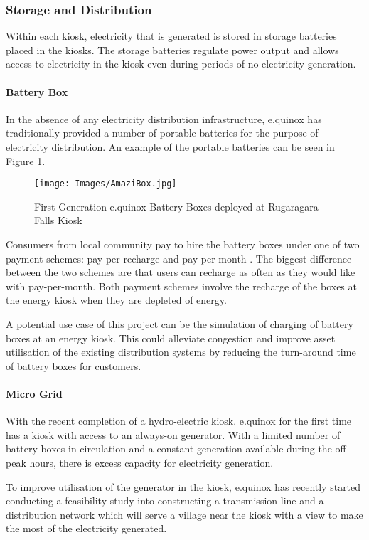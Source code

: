 \documentclass{article}
\begin{document}
\subsubsection{Storage and Distribution}
Within each kiosk, electricity that is generated is stored in storage batteries placed in the kiosks. The storage batteries regulate power output and allows access to electricity in the kiosk even during periods of no electricity generation.

\paragraph{Battery Box}
In the absence of any electricity distribution infrastructure, e.quinox has traditionally provided a number of portable batteries for the purpose of electricity distribution. An example of the portable batteries can be seen in Figure \ref{fig:AmaziBox}.

\begin{figure}[h!]
\centering
\texttt{[image: Images/AmaziBox.jpg]}
\caption{First Generation e.quinox Battery Boxes deployed at Rugaragara Falls Kiosk}
\label{fig:AmaziBox}
\end{figure}

Consumers from local community pay to hire the battery boxes under one of two payment schemes: pay-per-recharge and pay-per-month \cite{e.quinox-Hydro-web:2012}. The biggest difference between the two schemes are that users can recharge as often as they would like with pay-per-month. Both payment schemes involve the recharge of the boxes at the energy kiosk when they are depleted of energy.

A potential use case of this project can be the simulation of charging of battery boxes at an energy kiosk. This could alleviate congestion and improve asset utilisation of the existing distribution systems by reducing the turn-around time of battery boxes for customers.

\paragraph{Micro Grid}
With the recent completion of a hydro-electric kiosk. e.quinox for the first time has a kiosk with access to an always-on generator. With a limited number of battery boxes in circulation and a constant generation available during the off-peak hours, there is excess capacity for electricity generation.

To improve utilisation of the generator in the kiosk, e.quinox has recently started conducting a feasibility study into constructing a transmission line and a distribution network which will serve a village near the kiosk with a view to make the most of the electricity generated.
\end{document}
